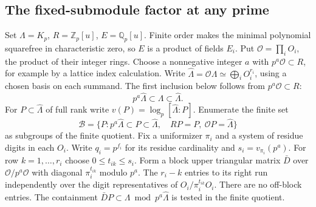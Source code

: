 \subsection{The fixed-submodule factor at any prime}
Set \(\Lambda=K_p\), \(R=\mathbb Z_p[u]\), \(E=\mathbb Q_p[u]\). Finite order makes the minimal polynomial squarefree in characteristic zero, so \(E\) is a product of fields \(E_i\). Put \(\mathcal O=\prod_i O_i\), the product of their integer rings. Choose a nonnegative integer \(a\) with \(p^a\mathcal O\subset R\), for example by a lattice index calculation. Write \(\widehat\Lambda=\mathcal O\Lambda\simeq\bigoplus_i O_i^{r_i}\), using a chosen basis on each summand. The first inclusion below follows from \(p^a\mathcal O\subset R\):
\[
 p^a\widehat\Lambda\subset\Lambda\subset\widehat\Lambda .
\]
For \(P\subset\widehat\Lambda\) of full rank write \(v(P)=\log_p[\widehat\Lambda:P]\). Enumerate the finite set
\[
 \mathcal B=\{ P:p^a\widehat\Lambda\subset P\subset\widehat\Lambda,\quad
                        RP=P,\ \mathcal O P=\widehat\Lambda\}
\]
as subgroups of the finite quotient. Fix a uniformizer \(\pi_i\) and a system of residue digits in each \(O_i\). Write \(q_i=p^{f_i}\) for its residue cardinality and \(s_i=v_{\pi_i}(p^a)\). For row \(k=1,\ldots,r_i\) choose \(0\le t_{ik}\le s_i\). Form a block upper triangular matrix \(\bar D\) over \(\mathcal O/p^a\mathcal O\) with diagonal \(\pi_i^{t_{ik}}\) modulo \(p^a\). The \(r_i-k\) entries to its right run independently over the digit representatives of \(O_i/\pi_i^{t_{ik}}O_i\). There are no off-block entries. The containment
\(\bar D P\subset\Lambda\bmod p^a\widehat\Lambda\) is tested in
the finite quotient.

